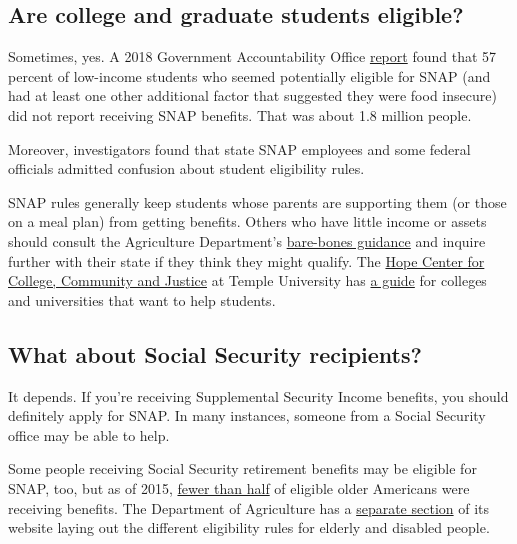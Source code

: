 \hypertarget{are-college-and-graduate-students-eligible}{%
\subsection{Are college and graduate students
eligible?}\label{are-college-and-graduate-students-eligible}}

Sometimes, yes. A 2018 Government Accountability Office
\href{https://www.gao.gov/assets/700/696254.pdf}{report} found that 57
percent of low-income students who seemed potentially eligible for SNAP
(and had at least one other additional factor that suggested they were
food insecure) did not report receiving SNAP benefits. That was about
1.8 million people.

Moreover, investigators found that state SNAP employees and some federal
officials admitted confusion about student eligibility rules.

SNAP rules generally keep students whose parents are supporting them (or
those on a meal plan) from getting benefits. Others who have little
income or assets should consult the Agriculture Department's
\href{https://www.fns.usda.gov/snap/students}{bare-bones guidance} and
inquire further with their state if they think they might qualify. The
\href{https://hope4college.com/about-the-hope-center/}{Hope Center for
College, Community and Justice} at Temple University has
\href{https://hope4college.com/wp-content/uploads/2019/04/Beyond-the-Food-Pantry-Student-Access-to-SNAP.pdf}{a
guide} for colleges and universities that want to help students.

\hypertarget{what-about-social-security-recipients}{%
\subsection{What about Social Security
recipients?}\label{what-about-social-security-recipients}}

It depends. If you're receiving Supplemental Security Income benefits,
you should definitely apply for SNAP. In many instances, someone from a
Social Security office may be able to help.

Some people receiving Social Security retirement benefits may be
eligible for SNAP, too, but as of 2015,
\href{https://www.fns.usda.gov/pressrelease/2015/020215}{fewer than
half} of eligible older Americans were receiving benefits. The
Department of Agriculture has a
\href{https://www.fns.usda.gov/snap/eligibility/elderly-disabled-special-rules}{separate
section} of its website laying out the different eligibility rules for
elderly and disabled people.

